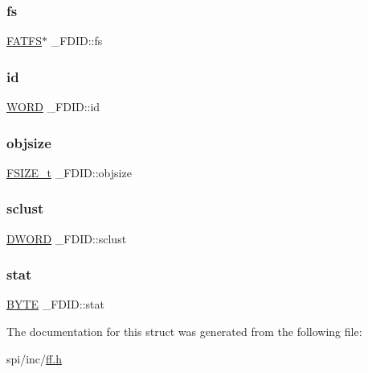 \mbox{\label{struct___f_d_i_d_aefa4597d88e54bace32e6c15e11d9610}} 
\subsubsection{\texorpdfstring{fs}{fs}}
{\footnotesize\ttfamily \mbox{\hyperlink{struct_f_a_t_f_s}{F\+A\+T\+FS}}$\ast$ \+\_\+\+F\+D\+I\+D\+::fs}

\mbox{\label{struct___f_d_i_d_a363d7bdab408418b911ac1502bc22ea6}} 
\subsubsection{\texorpdfstring{id}{id}}
{\footnotesize\ttfamily \mbox{\hyperlink{integer_8h_a197942eefa7db30960ae396d68339b97}{W\+O\+RD}} \+\_\+\+F\+D\+I\+D\+::id}

\mbox{\label{struct___f_d_i_d_a27039b8d89a4a62efabab36e6b303819}} 
\subsubsection{\texorpdfstring{objsize}{objsize}}
{\footnotesize\ttfamily \mbox{\hyperlink{ff_8h_a3fc0992ad7436250b6b1a0592214b7f2}{F\+S\+I\+Z\+E\+\_\+t}} \+\_\+\+F\+D\+I\+D\+::objsize}

\mbox{\label{struct___f_d_i_d_ae2fbaaa31b5d12b333cb6d1ded099412}} 
\subsubsection{\texorpdfstring{sclust}{sclust}}
{\footnotesize\ttfamily \mbox{\hyperlink{integer_8h_ad342ac907eb044443153a22f964bf0af}{D\+W\+O\+RD}} \+\_\+\+F\+D\+I\+D\+::sclust}

\mbox{\label{struct___f_d_i_d_a1a2ff09f2ef172772f4e7312070be708}} 
\subsubsection{\texorpdfstring{stat}{stat}}
{\footnotesize\ttfamily \mbox{\hyperlink{lz4_8c_a4ae1dab0fb4b072a66584546209e7d58}{B\+Y\+TE}} \+\_\+\+F\+D\+I\+D\+::stat}



The documentation for this struct was generated from the following file\+:\begin{DoxyCompactItemize}
\item 
spi/inc/\mbox{\hyperlink{ff_8h}{ff.\+h}}\end{DoxyCompactItemize}

